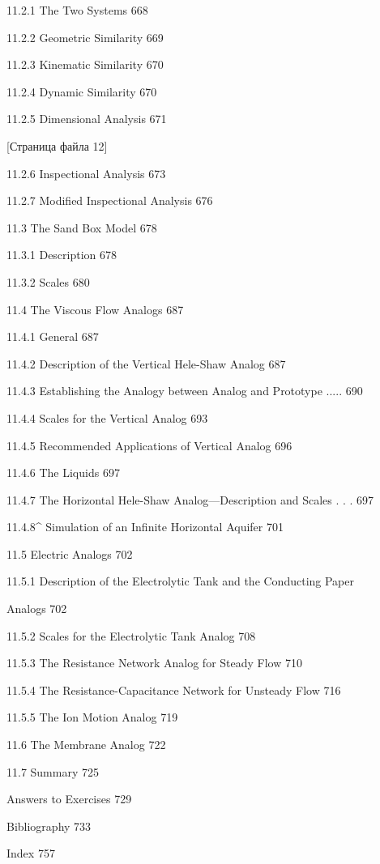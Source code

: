 \documentclass[
  11pt,
]{article}
\begin{document}
11.2.1 The Two Systems 668 \par
11.2.2 Geometric Similarity 669 \par
11.2.3 Kinematic Similarity 670 \par
11.2.4 Dynamic Similarity 670 \par
11.2.5 Dimensional Analysis 671 \par
\smallskip
\smallskip
\smallskip
{[}Страница файла 12{]}\par
11.2.6 Inspectional Analysis 673 \par
11.2.7 Modified Inspectional Analysis 676 \par
11.3 The Sand Box Model 678 \par
11.3.1 Description 678 \par
11.3.2 Scales 680 \par
11.4 The Viscous Flow Analogs 687 \par
11.4.1 General 687 \par
11.4.2 Description of the Vertical Hele-Shaw Analog 687 \par
11.4.3 Establishing the Analogy between Analog and Prototype ..... 690 \par
11.4.4 Scales for the Vertical Analog 693 \par
11.4.5 Recommended Applications of Vertical Analog 696 \par
11.4.6 The Liquids 697 \par
11.4.7 The Horizontal Hele-Shaw Analog---Description and Scales . . . 697 \par
11.4.8\^{} Simulation of an Infinite Horizontal Aquifer 701 \par
11.5 Electric Analogs 702 \par
11.5.1 Description of the Electrolytic Tank and the Conducting Paper \par
Analogs 702 \par
11.5.2 Scales for the Electrolytic Tank Analog 708 \par
11.5.3 The Resistance Network Analog for Steady Flow 710 \par
11.5.4 The Resistance-Capacitance Network for Unsteady Flow 716 \par
11.5.5 The Ion Motion Analog 719 \par
11.6 The Membrane Analog 722 \par
11.7 Summary 725 \par
Answers to Exercises 729 \par
Bibliography 733 \par
Index 757\par
\endgroup
\end{document}
